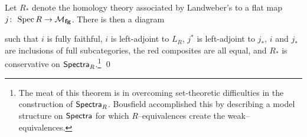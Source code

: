 \begin{theorem}
Let $R_*$ denote the homology theory associated by Landweber's  to a flat map $j\colon\thinspace \operatorname{Spec} R \to \mathcal{M}_{\mathbf{fg}}$.  There is then a diagram
\begin{center}
\end{center}
such that $i$ is fully faithful, $i$ is left-adjoint to $L_R$, $j^*$ is left-adjoint to $j_*$, $i$ and $j_*$ are inclusions of full subcategories, the red composites are all equal, and $R_*$ is conservative on $\mathsf{Spectra}_R$.\footnote{The meat of this theorem is in overcoming set-theoretic difficulties in the construction of $\mathsf{Spectra}_R$.  Bousfield accomplished this by describing a model structure on $\mathsf{Spectra}$ for which $R$--equivalences create the weak--equivalences.} \qed
\end{theorem}

